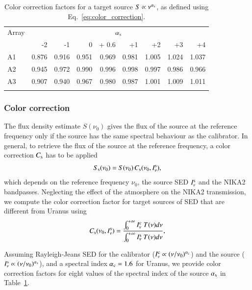 \begin{table}[!thbp]
\caption{Color correction factors for a target source  $S \propto \nu^{\alpha_{\rm{s}}}$, as defined using Eq.~\ref{eq:color_correction}.}
\label{tab:mod}
\centering 
\begin{tabular}{lrrrrrrrr}
\hline\hline
\noalign{\smallskip}
Array     & \multicolumn{8}{c}{$\alpha_{\rm{s}}$} \\
\noalign{\smallskip}
\hline
\noalign{\smallskip}
         &  -2 &  -1    &    0  & + 0.6 & +1  &  +2  & +3 & +4  \\       
\noalign{\smallskip}
\hline
\noalign{\smallskip}
          A1   & 0.876  &  0.916   &   0.951  & 0.969 &  0.981   &  1.005  &    1.024  &  1.037   \\
          A2   & 0.945  &  0.972   &   0.990  & 0.996 &  0.998   &  0.997  &    0.986  &  0.966      \\ 
          A3   & 0.907  &  0.940   &   0.967  & 0.980 &  0.987   &  1.001  &    1.009  &  1.011     \\
            \noalign{\smallskip}
            \hline
\end{tabular}
\end{table}

\subsubsection{Color correction}

The flux density estimate $S(\nu_{0})$ gives the
flux of the source at the reference frequency only if the source has
the same spectral behaviour as the calibrator. In general, to retrieve the
flux of the source at the reference frequency, a color correction
$C_{\rm{s}}$ has to be applied
\begin{equation}
S_{\rm{s}}(\nu_{0}) = S(\nu_{0}) \,  C_{\rm{s}}(\nu_{0}, I_\nu^{\rm{s}}),
\end{equation}
which depends on the reference frequency $\nu_{0}$, the source
SED $I_\nu^{\rm{s}}$ and the NIKA2 bandpasses.
Neglecting the effect of the atmosphere on the NIKA2 transmission, we
compute the color correction factor for target sources of SED that are
different from Uranus using
\begin{equation}
  C_{\rm{s}}(\nu_{0}, I_\nu^{\rm{s}}) = \frac{\int_{0}^{+\infty} I_\nu^{\rm{c}}~T({\nu}) d\nu}{ \int_{0}^{+\infty} I_\nu^{\rm{s}}~ T({\nu}) d\nu},
    \label{eq:color_correction}
\end{equation}

Assuming Rayleigh-Jeans SED for the calibrator
($I_\nu^{\rm{c}} \propto (\nu/\nu_0)^{\alpha_{\rm{c}}}$) and the source
($I_\nu^{\rm{s}} \propto (\nu/\nu_0)^{\alpha_{\rm{s}}}$), and a
spectral index $\alpha_{\rm{c}} = 1.6$ for Uranus, we provide color
correction factors for eight values of the spectral index of the
source $\alpha_{\rm{s}}$ in Table~\ref{tab:mod}.


